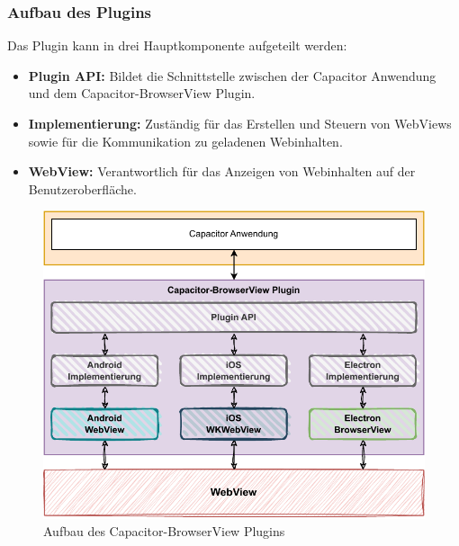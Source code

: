 \subsubsection{Aufbau des Plugins}

Das Plugin kann in drei Hauptkomponente aufgeteilt werden:

\begin{itemize}
    \item \textbf{Plugin API:} Bildet die Schnittstelle zwischen der Capacitor Anwendung und dem Capacitor-BrowserView Plugin.
    \item \textbf{Implementierung:} Zuständig für das Erstellen und Steuern von WebViews sowie für die Kommunikation zu geladenen Webinhalten.
    \item \textbf{WebView:} Verantwortlich für das Anzeigen von Webinhalten auf der Benutzeroberfläche.
\end{itemize}

\begin{figure}[H]
    \centering
    \includegraphics[width=\textwidth]{assets/03_Capacitor-BrowserView/02_Aufbau.drawio.pdf}
    \caption[Capacitor-BrowserView / Aufbau]{Aufbau des Capacitor-BrowserView Plugins}
\end{figure}
